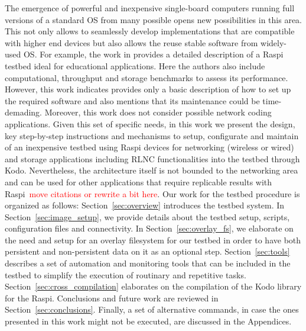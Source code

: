 The emergence of powerful and inexpensive single-board computers running full versions of a standard \ac{OS} from many possible opens new possibilities in this area. This not only allows to seamlessly develop implementations that are compatible with higher end devices but also allows the reuse stable software from widely-used \ac{OS}. For example, the work in \cite{cox2014iridis} provides a detailed description of a \ac{Raspi}~\cite{making_of_pi} testbed ideal for educational applications. Here the authors also include computational, throughput and storage benchmarks to assess its performance. However, this work indicates provides only a basic description of how to set up the required software and also mentions that its maintenance could be time-demading. Moreover, this work does not consider possible network coding applications. Given this set of specific needs, in this work we present the design, key step-by-step instructions and mechanisms to setup, configurate and maintain of an inexpensive testbed using \ac{Raspi} devices for networking (wireless or wired) and storage applications including \ac{RLNC} functionalities into the testbed through Kodo. Nevertheless, the architecture itself is not bounded to the networking area and can be used for other applications that require replicable results with \ac{Raspi}~\cite{leccese2014smartcity,leccese2014newimaging,sapes2016finger}\textcolor{red}{move citations or rewrite a bit here}. Our work for the testbed procedure is organized as follows: Section~\ref{sec:overview} introduces the testbed system. In Section~\ref{sec:image_setup}, we provide details about the testbed setup, scripts, configuration files and connectivity. In Section~\ref{sec:overlay_fs}, we elaborate on the need and setup for an overlay filesystem for our testbed in order to have both persistent and non-persistent data on it as an optional step. Section~\ref{sec:tools} describes a set of automation and monitoring tools that can be included in the testbed to simplify the execution of routinary and repetitive tasks. Section~\ref{sec:cross_compilation} elaborates on the compilation of the Kodo library for the \ac{Raspi}. Conclusions and future work are reviewed in Section~\ref{sec:conclusions}. Finally, a set of alternative commands, in case the ones presented in this work might not be executed, are discussed in the Appendices.

